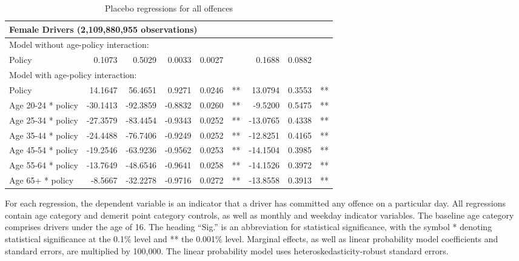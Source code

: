 \begin{table}
\begin{tabular}{l r r r r l r r l}
\hline 

\multicolumn{8}{l}{\textbf{Female Drivers} (2,109,880,955  observations)} \\ 

\hline
\multicolumn{8}{l}{Model without age-policy interaction: } \\ 
Policy                   &  0.1073        &  0.5029       &  0.0033        &  0.0027       &            &  0.1688        &  0.0882       &            \\ 
\hline
\multicolumn{8}{l}{Model with age-policy interaction: } \\ 
Policy                   &  14.1647        &  56.4651       &  0.9271        &  0.0246       &   **       &  13.0794        &  0.3553       &   **       \\ 
Age 20-24 * policy   &  -30.1413        &  -92.3859       &  -0.8832        &  0.0260       &   **       &  -9.5200        &  0.5475       &   **       \\ 
Age 25-34 * policy   &  -27.3579        &  -83.4454       &  -0.9343        &  0.0252       &   **       &  -13.0765        &  0.4338       &   **       \\ 
Age 35-44 * policy   &  -24.4488        &  -76.7406       &  -0.9249        &  0.0252       &   **       &  -12.8251        &  0.4165       &   **       \\ 
Age 45-54 * policy   &  -19.2546        &  -63.9236       &  -0.9562        &  0.0253       &   **       &  -14.1504        &  0.3985       &   **       \\ 
Age 55-64 * policy   &  -13.7649        &  -48.6546       &  -0.9641        &  0.0258       &   **       &  -14.1526        &  0.3972       &   **       \\ 
Age 65+ * policy   &  -8.5667        &  -32.2278       &  -0.9716        &  0.0272       &   **       &  -13.8558        &  0.3913       &   **       \\ 

\hline 

\end{tabular} 
\caption{Placebo regressions for all offences} 
For each regression, the dependent variable is an indicator that a driver has committed  
any offence on a particular day.  
All regressions contain age category and demerit point category controls, 
as well as monthly and weekday indicator variables. 
The baseline age category comprises drivers under the age of 16. 
The heading ``Sig.'' is an abbreviation for statistical significance, with 
the symbol * denoting statistical significance at the 0.1\% level 
and ** the 0.001\% level. 
Marginal effects, as well as linear probability model coefficients and standard errors, are  
multiplied by 100,000.  
The linear probability model uses heteroskedasticity-robust standard errors. 
\label{tab:seas_Logit_vs_LPMx100K_placebo_regs} 
\end{table} 
 
